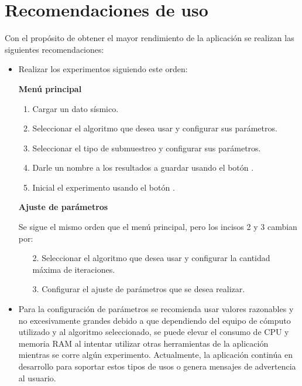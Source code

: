 \documentclass[12pt,twoside,letter]{ol-softwaremanual}
\begin{document}
\section{Recomendaciones de uso}

Con el propósito de obtener el mayor rendimiento de la aplicación se realizan las siguientes recomendaciones:

\begin{itemize}[leftmargin=0.5in]
	\setlength\itemsep{0em} 
    \item Realizar los experimentos siguiendo este orden:
    
    \textbf{Menú principal}
    
    \begin{enumerate}[leftmargin=0.5in]
    	\setlength\itemsep{0em} 
        \item Cargar un dato sísmico.
        \item Seleccionar el algoritmo que desea usar y configurar sus parámetros.
        \item Seleccionar el tipo de submuestreo y configurar sus parámetros.
        \item Darle un nombre a los resultados a guardar usando el botón \hspace{0.5mm} \faSave.
        \item Inicial el experimento usando el botón \hspace{0.5mm} \faPlay.
    \end{enumerate}
    
    \textbf{Ajuste de parámetros}
    
    Se sigue el mismo orden que el menú principal, pero los incisos 2 y 3 cambian por:
    
    \begin{enumerate}[leftmargin=0.5in]
    	\setlength\itemsep{0em} 
        \item[2.] Seleccionar el algoritmo que desea usar y configurar la cantidad máxima de iteraciones.
        \item[3.] Configurar el ajuste de parámetros que se desea realizar.
    \end{enumerate}
    
    \item Para la configuración de parámetros se recomienda usar valores razonables y no excesivamente grandes debido a que dependiendo del equipo de cómputo utilizado y al algoritmo seleccionado, se puede elevar el consumo de CPU y memoria RAM al intentar utilizar otras herramientas de la aplicación mientras se corre algún experimento. Actualmente, la aplicación continúa en desarrollo para soportar estos tipos de usos o genera mensajes de advertencia al usuario.
    
\end{itemize}


\end{document}
